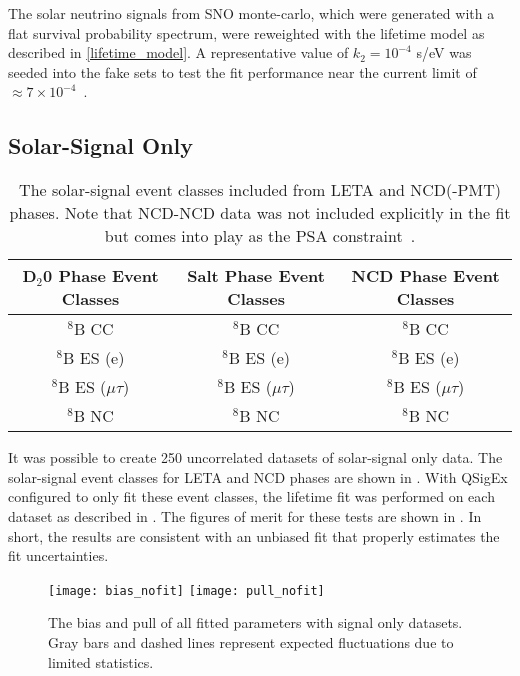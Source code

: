The solar neutrino signals from SNO monte-carlo, which were generated with a flat survival probability spectrum, were reweighted with the lifetime model as described in \ref{lifetime_model}. 
A representative value of $k_2 = 10^{-4}$ s/eV was seeded into the fake sets to test the fit performance near the current limit of $\approx7\times10^{-4}$~\cite{picoreti}.

\subsection{Solar-Signal Only}
\label{3phase_sigonly}

\begin{table}
\centering
\begin{tabular}{ccc}
\hline
D$_2$0 Phase Event Classes & Salt Phase Event Classes & NCD Phase Event Classes  \\ \hline \hline
$^8$B CC & $^8$B CC & $^8$B CC \\
$^8$B ES (e) & $^8$B ES (e) & $^8$B ES (e) \\
$^8$B ES ($\mu\tau$) & $^8$B ES ($\mu\tau$) & $^8$B ES ($\mu\tau$) \\
$^8$B NC & $^8$B NC & $^8$B NC \\ \hline
\end{tabular}
\caption{
The solar-signal event classes included from LETA and NCD(-PMT) phases. Note that NCD-NCD data was not included explicitly in the fit but comes into play as the PSA constraint~\cite{3phase}.
}
\label{tbl:sigonly_evcls}
\end{table}

It was possible to create 250 uncorrelated datasets of solar-signal only data.
The solar-signal event classes for LETA and NCD phases are shown in .
With QSigEx configured to only fit these event classes, the lifetime fit was performed on each dataset as described in . 
The figures of merit for these tests are shown in . 
In short, the results are consistent with an unbiased fit that properly estimates the fit uncertainties.

\begin{figure}
\centering
\texttt{[image: bias\_nofit]}
\texttt{[image: pull\_nofit]}
\caption{
The bias and pull of all fitted parameters with signal only datasets. Gray bars and dashed lines represent expected fluctuations due to limited statistics.
}
\label{fig:sigonly_biaspull}
\end{figure}

